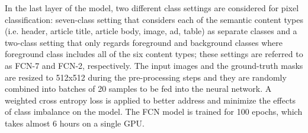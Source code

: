 \documentclass[letterpaper]{article} %
\begin{document}
In the last layer of the model, two different class settings are considered for pixel classification: seven-class setting that considers each of the semantic content types (i.e. header, article title, article body, image, ad, table) as separate classes and a two-class setting that only regards foreground and background classes where foreground class includes all of the six content types; these settings are referred to as FCN-7 and FCN-2, respectively.  
The input images and the ground-truth masks are resized to 512x512 during the pre-processing steps
and they are randomly combined into batches of 20 samples to be fed into the neural network. A weighted cross entropy loss is applied to better address and minimize the effects of class imbalance on the model. The FCN model is trained for 100 epochs, which takes almost 6 hours on a single GPU.


\end{document}
